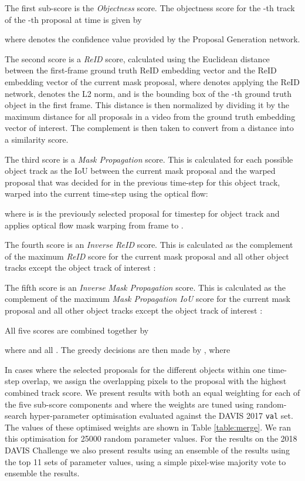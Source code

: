\documentclass[runningheads]{llncs}
\begin{document}
The first sub-score is the \textit{Objectness} score. The objectness score  for the -th track of the -th proposal  at time  is given by

where  denotes the confidence value provided by the Proposal Generation network.

The second score is a \textit{ReID} score, calculated using the Euclidean distance between the first-frame ground truth ReID embedding vector  and the ReID embedding vector  of the current mask proposal, where  denotes applying the ReID network,  denotes the L2 norm, and  is the bounding box of the -th ground truth object in the first frame. This distance is then normalized by dividing it by the maximum distance for all proposals in a video from the ground truth embedding vector of interest. The complement is then taken to convert from a distance into a similarity score.


The third score is a \textit{Mask Propagation} score. This is calculated for each possible object track as the IoU between the current mask proposal and the warped proposal that was decided for in the previous time-step for this object track, warped into the current time-step using the optical flow:

where  is is the previously selected proposal for timestep  for object track  and  applies optical flow mask warping from frame  to .

The fourth score is an \textit{Inverse ReID} score. This is calculated as the complement of the maximum \textit{ReID} score for the current mask proposal and all other object tracks  except the object track of interest :

The fifth score is an \textit{Inverse Mask Propagation} score. This is calculated as the complement of the maximum \textit{Mask Propagation IoU} score for the current mask proposal and all other object tracks  except the object track of interest :


All five scores are combined together by

where  and all . The greedy decisions are then made by 
, where 


In cases where the selected proposals for the different objects within one time-step overlap, we assign the overlapping pixels to the proposal with the highest combined track score.
We present results with both an equal weighting for each of the five sub-score components and where the weights are tuned using random-search hyper-parameter optimisation evaluated against the DAVIS 2017 \texttt{val} set. The values of these optimised weights are shown in Table \ref{table:merge}. We ran this optimisation for 25000 random parameter values. For the results on the 2018 DAVIS Challenge we also present results using an ensemble of the results using the top 11 sets of parameter values, using a simple pixel-wise majority vote to ensemble the results.
\end{document}
